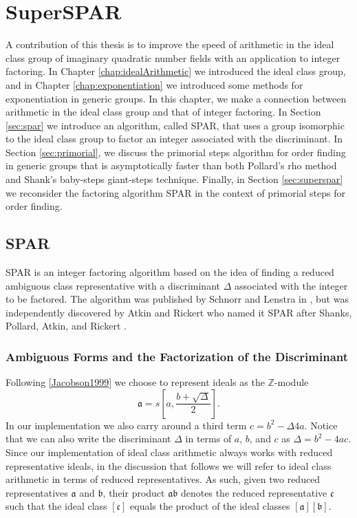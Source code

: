 \documentclass{ucalgthes1}
\theoremstyle{plain}
\theoremstyle{definition}
\newcommand{\ZZ}{\mathbb{Z}}
\begin{document}
\setcounter{chapter}{3}
\chapter{SuperSPAR}
\label{chap:superspar}

A contribution of this thesis is to improve the speed of arithmetic in the ideal class group of imaginary quadratic number fields with an application to integer factoring.  In Chapter \ref{chap:idealArithmetic} we introduced the ideal class group, and in Chapter \ref{chap:exponentiation} we introduced some methods for exponentiation in generic groups.  In this chapter, we make a connection between arithmetic in the ideal class group and that of integer factoring.  In Section \ref{sec:spar} we introduce an algorithm, called SPAR, that uses a group isomorphic to the ideal class group to factor an integer associated with the discriminant.  In Section \ref{sec:primorial}, we discuss the primorial steps algorithm for order finding in generic groups that is asymptotically faster than both Pollard's rho method and Shank's baby-steps giant-steps technique.  Finally, in Section \ref{sec:superspar} we reconsider the factoring algorithm SPAR in the context of primorial steps for order finding.

\section{SPAR}

SPAR is an integer factoring algorithm based on the idea of finding a reduced ambiguous class representative with a discriminant $\Delta$ associated with the integer to be factored.  The algorithm was published by Schnorr and Lenstra in \cite{Schnorr1984}, but was independently discovered by Atkin and Rickert who named it SPAR after Shanks, Pollard, Atkin, and Rickert \cite[p.182]{Jacobson1999}.

\subsection{Ambiguous Forms and the Factorization of the Discriminant}

Following \ref{Jacobson1999} we choose to represent ideals as the $\ZZ$-module
\[
	\mathfrak a = s \left[a, \frac{b + \sqrt\Delta}{2} \right].
\]
In our implementation we also carry around a third term $c = {b^2 - \Delta}{4a}$.  Notice that we can also write the discriminant $\Delta$ in terms of $a$, $b$, and $c$ as $\Delta = b^2 - 4ac$. Since our implementation of ideal class arithmetic always works with reduced representative ideals, in the discussion that follows we will refer to ideal class arithmetic in terms of reduced representatives.  As such, given two reduced representatives $\mathfrak a$ and $\mathfrak b$, their product $\mathfrak a \mathfrak b$ denotes the reduced representative $\mathfrak c$ such that the ideal class $[\mathfrak c]$ equals the product of the ideal classes $[\mathfrak a][\mathfrak b]$.
\end{document}
